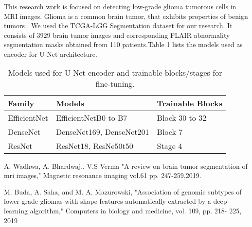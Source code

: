 \documentclass{article}
\begin{document}
This research work is focused on detecting low-grade glioma tumorous cells in MRI images. Glioma is a common brain tumor, that exhibits properties of benign tumors \cite{1}. We used the TCGA-LGG Segmentation dataset \cite{2} for our research. It consists of 3929 brain tumor images and corresponding FLAIR abnormality segmentation masks obtained from 110 patients.\newline Table 1 lists the models used as encoder for U-Net architecture.

\begin{table}[h]
    \centering
    \begin{tabularx}{\textwidth}{|X|X|X|}
        \hline
        \textbf{Family} & \textbf{Models}          & \textbf{Trainable Blocks} \\
        \hline
        EfficientNet    & EfficientNetB0 to B7     & Block 30 to 32            \\
        \hline
        DenseNet        & DenseNet169, DenseNet201 & Block 7                   \\
        \hline
        ResNet          & ResNet18, ResNe50t50     & Stage 4                   \\
        \hline
    \end{tabularx}
    \caption{Models used for U-Net encoder and trainable blocks/stages for fine-tuning.}
    \label{tab:my_label}
\end{table}

\begin{thebibliography}{9}
    A. Wadhwa, A. Bhardwaj,, V.S Verma "A review on brain tumor segmentation of mri images," Magnetic resonance imaging vol.61 pp. 247-259,2019.

    M. Buda, A. Saha, and M. A. Mazurowski, "Association of genomic subtypes of lower-grade gliomas with shape features automatically extracted by a deep learning algorithm," Computers in biology and medicine, vol. 109, pp. 218- 225, 2019
\end{thebibliography}
\end{document}
